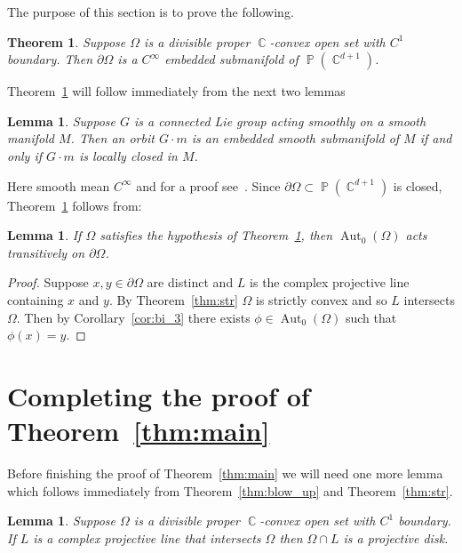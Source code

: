 \documentclass[12pt]{amsart}
\theoremstyle{plain}
\newtheorem{theorem}[proposition]{Theorem}
\newtheorem{lemma}[proposition]{Lemma}
\theoremstyle{definition}
\theoremstyle{remark}
\begin{document}
The purpose of this section is to prove the following.

\begin{theorem}\label{thm:smth}
Suppose $\Omega$ is a divisible proper $\operatorname{\mathbb{C}}$-convex open set with $C^1$ boundary. Then $\partial \Omega$ is a $C^\infty$ embedded submanifold of $\operatorname{\mathbb{P}}(\operatorname{\mathbb{C}}^{d+1})$. 
\end{theorem}

Theorem~\ref{thm:smth} will follow immediately from the next two lemmas

\begin{lemma}
Suppose $G$ is a connected Lie group acting smoothly on a smooth manifold $M$. Then an orbit $G\cdot m$ is an embedded smooth submanifold of $M$ if and only if $G \cdot m$ is locally closed in $M$. 
\end{lemma}

Here smooth mean $C^\infty$ and for a proof see~\cite[Theorem 15.3.7]{tD2008}. Since $\partial \Omega \subset \operatorname{\mathbb{P}}(\operatorname{\mathbb{C}}^{d+1})$ is closed, Theorem~\ref{thm:smth} follows from:

\begin{lemma}
If $\Omega$ satisfies the hypothesis of Theorem~\ref{thm:smth}, then $\operatorname{Aut}_0(\Omega)$ acts transitively on $\partial \Omega$.
\end{lemma}

\begin{proof}
Suppose $x,y \in \partial \Omega$ are distinct and $L$ is the complex projective line containing $x$ and $y$. By Theorem~\ref{thm:str} $\Omega$ is strictly convex and so $L$ intersects $\Omega$. Then by Corollary~\ref{cor:bi_3} there exists $\phi \in \operatorname{Aut}_0(\Omega)$ such that $\phi(x)=y$.
\end{proof}

\section{Completing the proof of Theorem~\ref{thm:main}}\label{sec:complete}

Before finishing the proof of Theorem~\ref{thm:main} we will need one more lemma which follows immediately from Theorem~\ref{thm:blow_up} and Theorem~\ref{thm:str}.

\begin{lemma}\label{lem:proj_disk}
Suppose $\Omega$ is a divisible proper $\operatorname{\mathbb{C}}$-convex open set with $C^1$ boundary. If $L$ is a complex projective line that intersects $\Omega$ then $\Omega \cap L$ is a projective disk.
\end{lemma}
\end{document}
